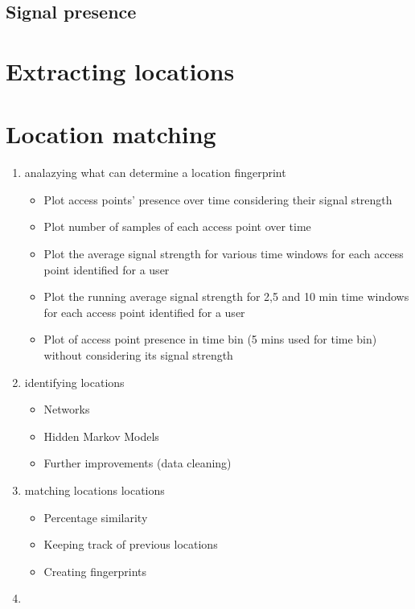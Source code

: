 \subsection{Signal presence}

\section{Extracting locations}
\section{Location matching}

\begin{enumerate}
  \item analazying what can determine a location fingerprint
	\begin{itemize}
		\item Plot access points’ presence over time considering their signal strength
		\item Plot number of samples of each access point over time
		\item Plot the average signal strength for various time windows for each
		access point identified for a user
		\item Plot the running average signal strength for 2,5 and 10 min time windows
		for each access point identified for a user
		\item Plot of access point presence in time bin (5 mins used for time bin)
		without considering its signal strength
	\end{itemize}
  \item identifying locations
	\begin{itemize}
		\item Networks 
		\item Hidden Markov Models 
		\item Further improvements (data cleaning)
	\end{itemize}
  \item matching locations locations
	\begin{itemize}
		\item Percentage similarity 
		\item Keeping track of previous locations 
		\item Creating fingerprints
	\end{itemize}
  \item  
\end{enumerate}